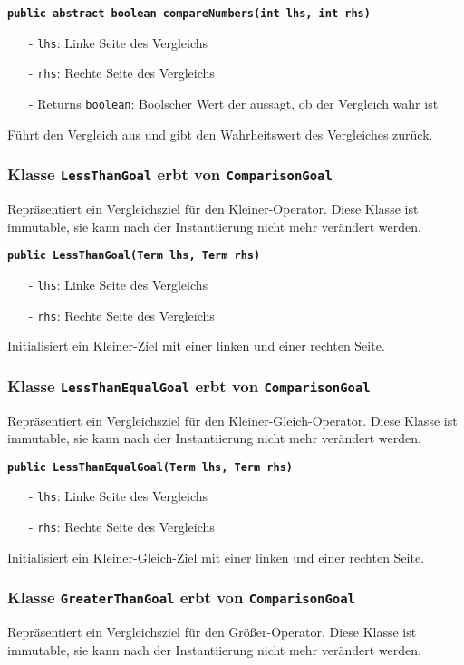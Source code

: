 \documentclass[parskip=full,11pt,twoside]{scrartcl}
\begin{document}
\textbf{\texttt{public abstract boolean compareNumbers(int lhs, int rhs)}}
\begin{itemize}[noitemsep]
	\item[-] \texttt{lhs}: Linke Seite des Vergleichs
	\item[-] \texttt{rhs}: Rechte Seite des Vergleichs
	\item[-] Returns \texttt{boolean}: Boolscher Wert der aussagt, ob der Vergleich wahr ist
\end{itemize}
Führt den Vergleich aus und gibt den Wahrheitswert des Vergleiches zurück.

\subsubsection{Klasse \texttt{LessThanGoal} erbt von \texttt{ComparisonGoal}}
Repräsentiert ein Vergleichsziel für den Kleiner-Operator. Diese Klasse ist immutable, sie kann nach der Instantiierung nicht mehr verändert werden.

\textbf{\texttt{public LessThanGoal(Term lhs, Term rhs)}}
\begin{itemize}[noitemsep]
	\item[-] \texttt{lhs}: Linke Seite des Vergleichs 
	\item[-] \texttt{rhs}: Rechte Seite des Vergleichs
\end{itemize}
Initialisiert ein Kleiner-Ziel mit einer linken und einer rechten Seite.

\subsubsection{Klasse \texttt{LessThanEqualGoal} erbt von \texttt{ComparisonGoal}}
Repräsentiert ein Vergleichsziel für den Kleiner-Gleich-Operator. Diese Klasse ist immutable, sie kann nach der Instantiierung nicht mehr verändert werden.

\textbf{\texttt{public LessThanEqualGoal(Term lhs, Term rhs)}}
\begin{itemize}[noitemsep]
	\item[-] \texttt{lhs}: Linke Seite des Vergleichs
	\item[-] \texttt{rhs}: Rechte Seite des Vergleichs
\end{itemize}
Initialisiert ein Kleiner-Gleich-Ziel mit einer linken und einer rechten Seite.

\subsubsection{Klasse \texttt{GreaterThanGoal} erbt von \texttt{ComparisonGoal}}
Repräsentiert ein Vergleichsziel für den Größer-Operator. Diese Klasse ist immutable, sie kann nach der Instantiierung nicht mehr verändert werden.
\end{document}
